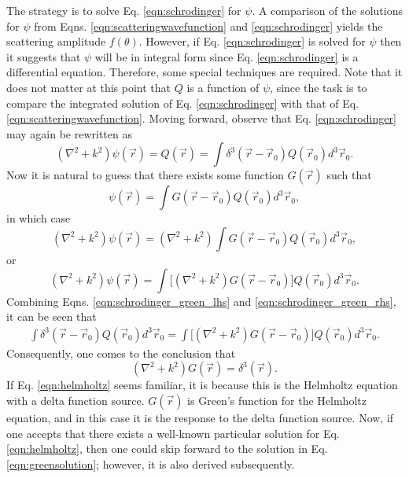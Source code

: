 The strategy is to solve Eq. \eqref{eqn:schrodinger} for $\psi$. A comparison of the solutions for $\psi$ from Eqns. \ref{eqn:scatteringwavefunction} and \ref{eqn:schrodinger} yields the scattering amplitude $f(\theta)$. However, if Eq. \eqref{eqn:schrodinger} is solved for $\psi$ then it suggests that $\psi$ will be in integral form since  Eq. \eqref{eqn:schrodinger} is a differential equation. Therefore, some special techniques are required. Note that it does not matter at this point that $Q$ is a function of $\psi$, since the task is to compare the integrated solution of Eq. \eqref{eqn:schrodinger} with that of Eq. \eqref{eqn:scatteringwavefunction}. Moving forward, observe  that Eq. \eqref{eqn:schrodinger} may again be rewritten as
%
\begin{equation} \label{eqn:schrodinger_green_lhs}
(\nabla^2+k^2)\psi(\vec{r})=Q (\vec{r}) =\int \delta^3(\vec{r}-\vec{r}_0)Q(\vec{r}_0)d^3\vec{r}_0.
\end{equation}
Now it is natural to guess that there exists some function $G(\vec{r})$ such that
%
\begin{equation}
\label{eqn:psigreen}
\psi(\vec{r})=\int G(\vec{r}-\vec{r}_0)Q(\vec{r}_0)d^3\vec{r}_0,
\end{equation}
in which case
%
\begin{equation} \nonumber
(\nabla^2+k^2)\psi(\vec{r})=(\nabla^2+k^2)\int G(\vec{r}-\vec{r}_0)Q(\vec{r}_0) d^3\vec{r}_0,
\end{equation}
or
\begin{equation} \label{eqn:schrodinger_green_rhs}
(\nabla^2+k^2)\psi(\vec{r})=\int \big[(\nabla^2+k^2)G(\vec{r}-\vec{r}_0)\big]Q(\vec{r}_0) d^3\vec{r}_0.
\end{equation}
%
Combining Eqns. \ref{eqn:schrodinger_green_lhs} and \ref{eqn:schrodinger_green_rhs}, it can be seen that
\begin{align*}
\int \delta^3(\vec{r}-\vec{r}_0)Q(\vec{r}_0)d^3\vec{r}_0=\int \big[(\nabla^2+k^2)G(\vec{r}-\vec{r}_0)\big]Q(\vec{r}_0) d^3\vec{r}_0.
\end{align*}
Consequently, one comes to the conclusion that
%
\begin{equation}
\label{eqn:helmholtz}
(\nabla^2+k^2)G(\vec{r})=\delta^3(\vec{r}).
\end{equation}
If Eq. \eqref{eqn:helmholtz} seems familiar, it is because this is the Helmholtz equation with a delta function source. $G(\vec{r})$ is Green's function for the Helmholtz equation, and in this case it is the response to the delta function source. Now, if one accepts that there exists a well-known particular solution for Eq. \eqref{eqn:helmholtz}, then one could skip forward to the solution in Eq. \eqref{eqn:greensolution}; however, it is also derived subsequently.

